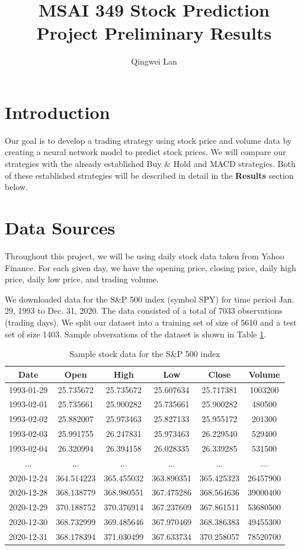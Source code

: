 \documentclass[10pt]{article}
\title{MSAI 349 Stock Prediction Project Preliminary Results}
\author{Qingwei Lan}
\begin{document}
\maketitle



\section{Introduction}

Our goal is to develop a trading strategy using stock price and volume data by creating a neural network model to predict stock prices. We will compare our strategies with the already established Buy \& Hold and MACD strategies. Both of these established strategies will be described in detail in the \textbf{Results} section below.


\section{Data Sources}

Throughout this project, we will be using daily stock data taken from Yahoo Finance. For each given day, we have the opening price, closing price, daily high price, daily low price, and trading volume.

We downloaded data for the S\&P 500 index (symbol SPY) for time period Jan. 29, 1993 to Dec. 31, 2020. The data consisted of a total of 7033 observations (trading days). We split our dataset into a training set of size of 5610 and a test set of size 1403. Sample obversations of the dataset is shown in Table \ref{datasample}.

\begin{table}[H]
\centering
\begin{tabular}{| c | c c c c c |} 
\hline
Date & Open & High & Low & Close & Volume \\
\hline
1993-01-29 & 25.735672  & 25.735672  & 25.607634  & 25.717381  & 1003200 \\
1993-02-01 & 25.735661  & 25.900282  & 25.735661  & 25.900282  & 480500 \\
1993-02-02 & 25.882007  & 25.973463  & 25.827133  & 25.955172  & 201300 \\
1993-02-03 & 25.991755  & 26.247831  & 25.973463  & 26.229540  & 529400 \\ 
1993-02-04 & 26.320994  & 26.394158  & 26.028335  & 26.339285  & 531500 \\
... & ... & ... & ... & ... & ... \\
2020-12-24 & 364.514223 & 365.455032 & 363.890351 & 365.425323 & 26457900 \\
2020-12-28 & 368.138779 & 368.980551 & 367.475286 & 368.564636 & 39000400 \\
2020-12-29 & 370.188752 & 370.376914 & 367.237609 & 367.861511 & 53680500 \\
2020-12-30 & 368.732999 & 369.485646 & 367.970469 & 368.386383 & 49455300 \\
2020-12-31 & 368.178394 & 371.030499 & 367.633734 & 370.258057 & 78520700 \\
\hline
\end{tabular}
\caption{Sample stock data for the S\&P 500 index}
\label{datasample}
\end{table}
\end{document}
